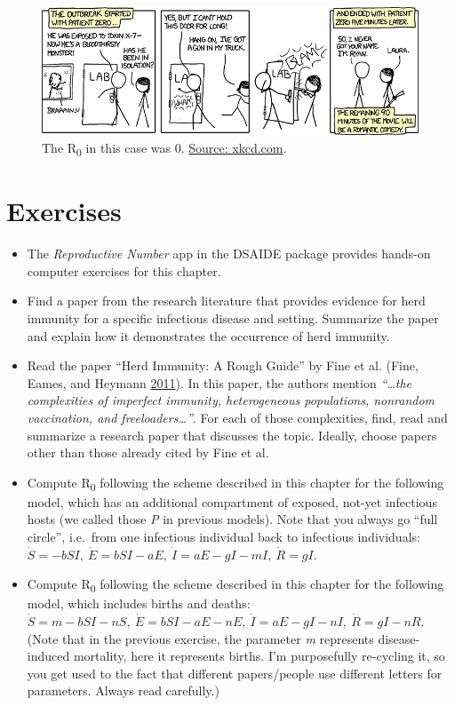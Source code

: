 \documentclass[]{book}
\providecommand{\tightlist}{%
  \setlength{\itemsep}{0pt}\setlength{\parskip}{0pt}}
\theoremstyle{definition}
\theoremstyle{definition}
\theoremstyle{definition}
\theoremstyle{remark}
\begin{document}
\begin{figure}
\centering
\includegraphics{./images/xkcd-outbreak-control.png}
\caption{\label{fig:xkcd-outbreak-control}The R\textsubscript{0} in this
case was 0. \href{https://xkcd.com/734/}{Source: xkcd.com}.}
\end{figure}

\hypertarget{exercises}{%
\section{Exercises}\label{exercises}}

\begin{itemize}
\tightlist
\item
  The \emph{Reproductive Number} app in the DSAIDE package provides
  hands-on computer exercises for this chapter.
\item
  Find a paper from the research literature that provides evidence for
  herd immunity for a specific infectious disease and setting. Summarize
  the paper and explain how it demonstrates the occurrence of herd
  immunity.
\item
  Read the paper ``Herd Immunity: A Rough Guide'' by Fine et al. (Fine,
  Eames, and Heymann \protect\hyperlink{ref-fine11}{2011}). In this
  paper, the authors mention \emph{``\ldots{}the complexities of
  imperfect immunity, heterogeneous populations, nonrandom vaccination,
  and freeloaders\ldots{}''}. For each of those complexities, find, read
  and summarize a research paper that discusses the topic. Ideally,
  choose papers other than those already cited by Fine et al.
\item
  Compute R\textsubscript{0} following the scheme described in this
  chapter for the following model, which has an additional compartment
  of exposed, not-yet infectious hosts (we called those \emph{P} in
  previous models). Note that you always go ``full circle'', i.e.~from
  one infectious individual back to infectious individuals:
  \(\dot S = -b SI, \ \dot E = b S I - a E, \ \dot I = a E - g I - m I, \ \dot R = g I\).
\item
  Compute R\textsubscript{0} following the scheme described in this
  chapter for the following model, which includes births and deaths:
  \(\dot S =m - b SI - n S, \ \dot E = b S I - a E - n E, \ \dot I = a E - g I - n I, \ \dot R = g I - n R\).
  (Note that in the previous exercise, the parameter \emph{m} represents
  disease-induced mortality, here it represents births. I'm purposefully
  re-cycling it, so you get used to the fact that different
  papers/people use different letters for parameters. Always read
  carefully.)
\end{itemize}
\end{document}
